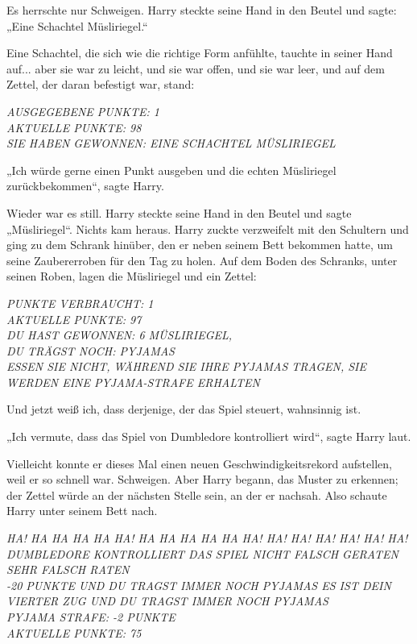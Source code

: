 {Es herrschte nur Schweigen. Harry steckte seine Hand in den Beutel und sagte: „Eine Schachtel Müsliriegel.“

Eine Schachtel, die sich wie die richtige Form anfühlte, tauchte in seiner Hand auf... aber sie war zu leicht, und sie war offen, und sie war leer, und auf dem Zettel, der daran befestigt war, stand:

\emph{AUSGEGEBENE PUNKTE: 1}\\ \emph{AKTUELLE PUNKTE: 98}\\ \emph{SIE HABEN GEWONNEN: EINE SCHACHTEL MÜSLIRIEGEL}

„Ich würde gerne einen Punkt ausgeben und die echten Müsliriegel zurückbekommen“, sagte Harry.

Wieder war es still. Harry steckte seine Hand in den Beutel und sagte „Müsliriegel“. Nichts kam heraus. Harry zuckte verzweifelt mit den Schultern und ging zu dem Schrank hinüber, den er neben seinem Bett bekommen hatte, um seine Zaubererroben für den Tag zu holen. Auf dem Boden des Schranks, unter seinen Roben, lagen die Müsliriegel und ein Zettel:

\emph{PUNKTE VERBRAUCHT: 1}\\ \emph{AKTUELLE PUNKTE: 97}\\ \emph{DU HAST GEWONNEN: 6 MÜSLIRIEGEL,}\\ \emph{DU TRÄGST NOCH: PYJAMAS}\\ \emph{ESSEN SIE NICHT, WÄHREND SIE IHRE PYJAMAS TRAGEN, SIE WERDEN EINE PYJAMA-STRAFE ERHALTEN}

Und jetzt weiß ich, dass derjenige, der das Spiel steuert, wahnsinnig ist.

„Ich vermute, dass das Spiel von Dumbledore kontrolliert wird“, sagte Harry laut.

Vielleicht konnte er dieses Mal einen neuen Geschwindigkeitsrekord aufstellen, weil er so schnell war. Schweigen. Aber Harry begann, das Muster zu erkennen; der Zettel würde an der nächsten Stelle sein, an der er nachsah. Also schaute Harry unter seinem Bett nach.

\emph{HA! HA HA HA HA HA! HA HA HA HA HA HA! HA! HA! HA! HA! HA! HA! DUMBLEDORE KONTROLLIERT DAS SPIEL NICHT FALSCH GERATEN SEHR FALSCH RATEN}\\ \emph{-20 PUNKTE UND DU TRAGST IMMER NOCH PYJAMAS ES IST DEIN VIERTER ZUG UND DU TRAGST IMMER NOCH PYJAMAS}\\ \emph{PYJAMA STRAFE: -2 PUNKTE}\\ \emph{AKTUELLE PUNKTE: 75}

}
